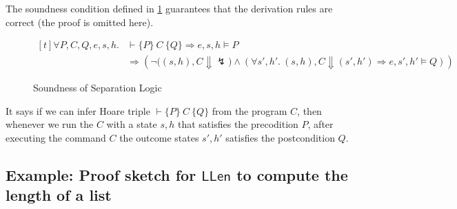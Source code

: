 \documentclass[11pt]{article}
\newcommand{\LLen}{\mathsf{LLen}}
\begin{document}
The soundness condition defined in \cref{soundness} guarantees that the derivation rules are
correct (the proof is omitted here). 

\begin{figure}[H]
      
\[
\begin{aligned}[t]
\forall P, C, Q, e, s, h.&
\vdash \{P\}\ C\ \{Q\}
\Longrightarrow e, s, h \models P \\
& \Longrightarrow
\left(
  \neg\bigl((s,h), C \Downarrow \lightning\bigr)
  \land
  \left(
    \forall s', h'.\ 
    (s,h), C \Downarrow (s',h')
    \Longrightarrow e, s', h' \models Q
  \right)
\right)
\end{aligned}
\]
\caption{Soundness of Separation Logic}
\label{soundness}
\end{figure}

It says if we can infer Hoare triple $\vdash \{P\}\ C\ \{Q\}$ from the program
$C$, then whenever we run the $C$ with a state $s, h$ that satisfies the
precodition $P$, after executing the command $C$ the outcome states $s', h'$
satisfies the postcondition $Q$.\\



\subsection{Example: Proof sketch for \texorpdfstring{$\LLen$}{LLen} to compute the length of a list}
\end{document}
